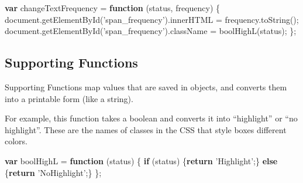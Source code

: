 \documentclass[]{article}
\newenvironment{Shaded}{}{}
\newcommand{\KeywordTok}[1]{\textcolor[rgb]{0.00,0.44,0.13}{\textbf{#1}}}
\newcommand{\StringTok}[1]{\textcolor[rgb]{0.25,0.44,0.63}{#1}}
\newcommand{\VariableTok}[1]{\textcolor[rgb]{0.10,0.09,0.49}{#1}}
\newcommand{\ControlFlowTok}[1]{\textcolor[rgb]{0.00,0.44,0.13}{\textbf{#1}}}
\newcommand{\OperatorTok}[1]{\textcolor[rgb]{0.40,0.40,0.40}{#1}}
\newcommand{\AttributeTok}[1]{\textcolor[rgb]{0.49,0.56,0.16}{#1}}
\newcommand{\NormalTok}[1]{#1}
\begin{document}
\begin{Shaded}
\begin{Highlighting}[]
\KeywordTok{var}\NormalTok{ changeTextFrequency }\OperatorTok{=} \KeywordTok{function}\NormalTok{ (status}\OperatorTok{,}\NormalTok{ frequency) }\OperatorTok{\{}
    \VariableTok{document}\NormalTok{.}\AttributeTok{getElementById}\NormalTok{(}\StringTok{'span_frequency'}\NormalTok{).}\AttributeTok{innerHTML} \OperatorTok{=} \VariableTok{frequency}\NormalTok{.}\AttributeTok{toString}\NormalTok{()}\OperatorTok{;}
    \VariableTok{document}\NormalTok{.}\AttributeTok{getElementById}\NormalTok{(}\StringTok{'span_frequency'}\NormalTok{).}\AttributeTok{className} \OperatorTok{=} \AttributeTok{boolHighL}\NormalTok{(status)}\OperatorTok{;} 
\OperatorTok{\};}
\end{Highlighting}
\end{Shaded}

\subsection{Supporting Functions}\label{supporting-functions}

Supporting Functions map values that are saved in objects, and converts
them into a printable form (like a string).

For example, this function takes a boolean and converts it into
``highlight'' or ``no highlight''. These are the names of classes in the
CSS that style boxes different colors.

\begin{Shaded}
\begin{Highlighting}[]
\KeywordTok{var}\NormalTok{ boolHighL }\OperatorTok{=} \KeywordTok{function}\NormalTok{ (status) }\OperatorTok{\{}
    \ControlFlowTok{if}\NormalTok{ (status) }\OperatorTok{\{}\ControlFlowTok{return} \StringTok{'Highlight'}\OperatorTok{;\}} 
    \ControlFlowTok{else}        \OperatorTok{\{}\ControlFlowTok{return} \StringTok{'NoHighlight'}\OperatorTok{;\}}
\OperatorTok{\};}
\end{Highlighting}
\end{Shaded}
\end{document}
